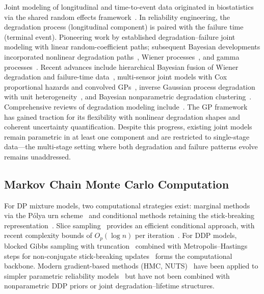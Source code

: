 \documentclass[a4paper,fleqn,longmktitle]{cas-sc}
\begin{document}
Joint modeling of longitudinal and time-to-event data originated in biostatistics via the shared random effects framework~\cite{Wulfsohn1997,Henderson2000,Tsiatis2004,Rizopoulos2012}. In reliability engineering, the degradation process (longitudinal component) is paired with the failure time (terminal event). Pioneering work by \cite{Lu1997} established degradation--failure joint modeling with linear random-coefficient paths; subsequent Bayesian developments incorporated nonlinear degradation paths~\cite{Bae2007}, Wiener processes~\cite{Peng2010}, and gamma processes~\cite{Wang2002}. Recent advances include hierarchical Bayesian fusion of Wiener degradation and failure-time data~\cite{Fu2024}, multi-sensor joint models with Cox proportional hazards and convolved GPs~\cite{Fard2025}, inverse Gaussian process degradation with unit heterogeneity~\cite{Fan2024,Zheng2024b}, and Bayesian nonparametric degradation clustering~\cite{Nguyen2023}. Comprehensive reviews of degradation modeling include~\cite{Si2014,Zhang2018}. The GP framework~\cite{Rasmussen2006} has gained traction for its flexibility with nonlinear degradation shapes and coherent uncertainty quantification. Despite this progress, existing joint models remain parametric in at least one component and are restricted to single-stage data---the multi-stage setting where both degradation and failure patterns evolve remains unaddressed.

\subsection{Markov Chain Monte Carlo Computation}
\label{sec:lit_mcmc}

For DP mixture models, two computational strategies exist: marginal methods via the P\'{o}lya urn scheme~\cite{Escobar1995,Neal2000} and conditional methods retaining the stick-breaking representation~\cite{Ishwaran2001}. Slice sampling~\cite{Neal2003,Walker2007,Kalli2011} provides an efficient conditional approach, with recent complexity bounds of $O_p(\log n)$ per iteration~\cite{Franzolini2025}. For DDP models, blocked Gibbs sampling with truncation~\cite{Ishwaran2001} combined with Metropolis--Hastings steps for non-conjugate stick-breaking updates~\cite{Griffin2011} forms the computational backbone. Modern gradient-based methods (HMC, NUTS)~\cite{Neal2011,Hoffman2014} have been applied to simpler parametric reliability models~\cite{AbdelGhaly2023,Jayamanne2023} but have not been combined with nonparametric DDP priors or joint degradation--lifetime structures.
\end{document}
